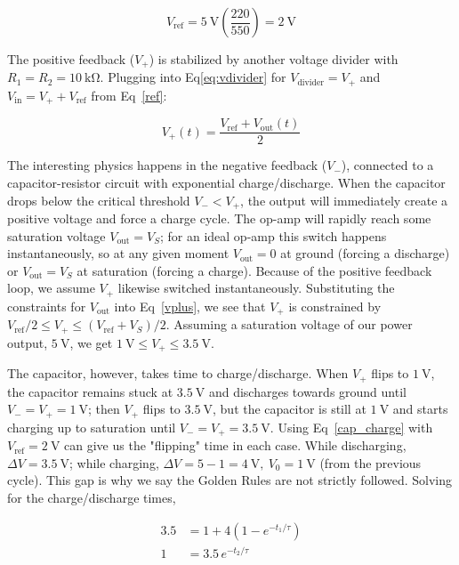 \documentclass[11pt]{article}
\begin{document}
\begin{equation}
        \label{ref}
        V_\text{ref}=\qty{5}{\volt}\left(\frac{ 220}{550}\right)=\qty{2}{\volt}
\end{equation}

The positive feedback ($V_+$) is stabilized by another voltage divider with $R_1=R_2=\qty{10}{\kilo\ohm}$. Plugging into Eq\eqref{eq:vdivider} for $V_\text{divider}=V_+$ and $V_\text{in}=V_+ + V_\text{ref}$  from Eq~\eqref{ref}:

\begin{equation}
        \label{vplus}
        V_+(t)  =    \frac{ V_\text{ref} + V_\text{out}(t)}{2}
\end{equation}

The interesting physics happens in the negative feedback ($V_-$), connected to a capacitor-resistor circuit with exponential charge/discharge. When the capacitor drops below the critical threshold $V_-<V_+$, the output will immediately create a positive voltage and force a charge cycle. The op-amp will rapidly reach some saturation voltage $V_\text{out}=V_S$; for an ideal op-amp this switch happens instantaneously, so at any given moment $V_\text{out}=0$ at ground (forcing a discharge) or $V_\text{out}=V_S$ at saturation (forcing a charge). Because of the positive feedback loop, we assume $V_+$ likewise switched instantaneously. Substituting the constraints for $V_\text{out}$ into Eq~\eqref{vplus}, we see that $V_+$ is constrained by $V_\text{ref}/2 \leq V_+ \leq (V_\text{ref} + V_S) / 2$. Assuming a saturation voltage of our power output, $\qty{5}{\volt}$, we get $\qty{1}{\volt} \leq V_+ \leq \qty{3.5}{\volt}$.

The capacitor, however, takes time to charge/discharge. When $V_+$ flips to $\qty{1}{\volt}$, the capacitor remains stuck at $\qty{3.5}{\volt}$ and discharges towards ground until $V_-=V_+=\qty{1}{\volt}$; then $V_+$ flips to $\qty{3.5}{\volt}$, but the capacitor is still at $\qty{1}{\volt}$ and starts charging up to saturation until $V_-=V_+=\qty{3.5}{\volt}$. Using Eq~\eqref{cap_charge} with $V_\text{ref}=\qty{2}{\volt}$ can give us the "flipping" time in each case. While discharging, $\Delta V = \qty{3.5}{\volt}$; while charging, $\Delta V = 5-1= \qty{4}{\volt}, \ V_0 = \qty{1}{\volt}$ (from the previous cycle). This gap is why we say the Golden Rules are not strictly followed. Solving for the charge/discharge times,

\begin{align*}
        3.5 & =1+4\left(1-e^{-t_1/\tau}\right) \\
        1   & =3.5\,e^{-t_2/\tau}
\end{align*}
\end{document}
